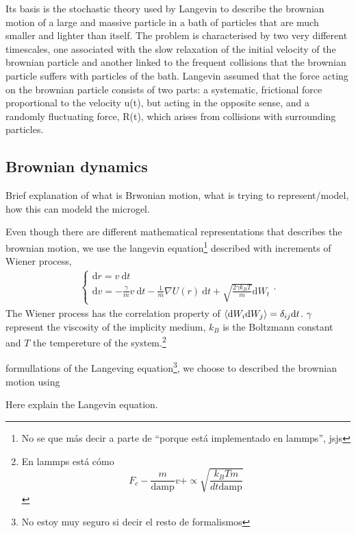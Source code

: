 \documentclass[../../main-notes.tex]{subfiles}
\begin{document}
Its basis is the stochastic theory used by Langevin to describe the brownian motion of a large and massive particle in a bath of particles that are much smaller and lighter than itself. 
The problem is characterised by two very different timescales, one associated with the slow relaxation of the initial velocity of the brownian particle and another linked to the frequent collisions that the brownian particle suffers with particles of the bath. 
Langevin assumed that the force acting on the brownian particle consists of two parts: a systematic, frictional force proportional to the velocity u(t), but acting in the opposite sense, and a randomly fluctuating force, R(t), which arises from collisions with surrounding particles.


\subsection{Brownian dynamics}

Brief explanation of what is Brwonian motion, what is trying to represent/model, how this can modeld the microgel.

Even though there are different mathematical representations that describes the brownian motion, we use the langevin equation\footnote{No se que más decir a parte de ``porque está implementado en lammps'', jsjs} described with increments of Wiener process,
\begin{gather}
    \left\{
        \begin{array}{l}
            \mathrm{d}r = v~\mathrm{d}t \\
            \mathrm{d}v = -\frac{\gamma}{m}v~\mathrm{d}t - \frac{1}{m}\nabla U(r)~\mathrm{d}t + \sqrt{\frac{2\gamma k_B T}{m}}\mathrm{d}W_t
        \end{array}
    \right..\label{eqn:BrownianDyn1}
\end{gather}
The Wiener process has the correlation property of $\expval{\mathrm{d}W_{i}\mathrm{d}W_{j}}=\delta_{ij}\mathrm{d}t$.
$\gamma$ represent the viscosity of the implicity medium, $k_B$ is the Boltzmann constant and $T$ the tempereture of the system.\footnote{En lammps está cómo\[F_c-\frac{m}{\mathrm{damp}}v+\propto\sqrt{\frac{k_B Tm}{dt\mathrm{damp}}}\]}

formullations of the Langeving equation\footnote{No estoy muy seguro si decir el resto de formalismos}, we choose to described the brownian motion using 

Here explain the Langevin equation. 
\end{document}
